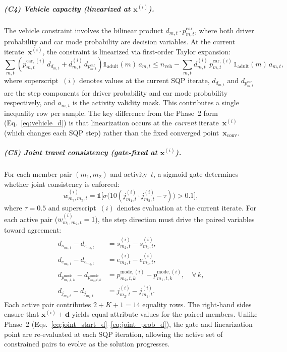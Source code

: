 \documentclass[11pt,a4paper]{article}
\newcommand{\indicator}{\mathbb{1}}
\newcommand{\xconv}{\mathbf{x}_{\mathrm{conv}}}
\begin{document}
\subparagraph{(C4) Vehicle capacity (linearized at $\mathbf{x}^{(i)}$).}
The vehicle constraint involves the bilinear product $d_{m,t} \cdot p^{\mathrm{car}}_{m,t}$, where both driver probability and car mode probability are decision variables.
At the current iterate~$\mathbf{x}^{(i)}$, the constraint is linearized via first-order Taylor expansion:
\begin{equation}
    \sum_{m,t} \left( p^{\mathrm{car},(i)}_{m,t} \, d_{d_{m,t}} + d^{(i)}_{m,t} \, d_{p^{\mathrm{car}}_{m,t}} \right) \indicator_{\mathrm{adult}}(m) \, a_{m,t}
    \leq n_{\mathrm{veh}} - \sum_{m,t} d^{(i)}_{m,t} \, p^{\mathrm{car},(i)}_{m,t} \, \indicator_{\mathrm{adult}}(m) \, a_{m,t},
    \label{eq:vehicle_sqp}
\end{equation}
where superscript~$(i)$ denotes values at the current SQP iterate, $d_{d_{m,t}}$ and $d_{p^{\mathrm{car}}_{m,t}}$ are the step components for driver probability and car mode probability respectively, and $a_{m,t}$ is the activity validity mask.
This contributes a single inequality row per sample.
The key difference from the Phase~2 form (Eq.~\ref{eq:vehicle_d}) is that linearization occurs at the \emph{current} iterate~$\mathbf{x}^{(i)}$ (which changes each SQP step) rather than the fixed converged point~$\xconv$.

\subparagraph{(C5) Joint travel consistency (gate-fixed at $\mathbf{x}^{(i)}$).}
For each member pair $(m_1, m_2)$ and activity~$t$, a sigmoid gate determines whether joint consistency is enforced:
\begin{equation}
    w^{(i)}_{m_1,m_2,t} = \indicator\!\bigl[\sigma\!\bigl(10(j^{(i)}_{m_1,t} \cdot j^{(i)}_{m_2,t} - \tau)\bigr) > 0.1\bigr],
    \label{eq:joint_gate_sqp}
\end{equation}
where $\tau = 0.5$ and superscript~$(i)$ denotes evaluation at the current iterate.
For each active pair ($w^{(i)}_{m_1,m_2,t} = 1$), the step direction must drive the paired variables toward agreement:
\begin{align}
    d_{s_{m_1,t}} - d_{s_{m_2,t}} &= s^{(i)}_{m_2,t} - s^{(i)}_{m_1,t}, \label{eq:joint_start_sqp}\\
    d_{e_{m_1,t}} - d_{e_{m_2,t}} &= e^{(i)}_{m_2,t} - e^{(i)}_{m_1,t}, \label{eq:joint_end_sqp}\\
    d_{p^{\mathrm{mode}}_{m_1,t,k}} - d_{p^{\mathrm{mode}}_{m_2,t,k}} &= p^{\mathrm{mode},(i)}_{m_2,t,k} - p^{\mathrm{mode},(i)}_{m_1,t,k}, \quad \forall\, k, \label{eq:joint_mode_sqp}\\
    d_{j_{m_1,t}} - d_{j_{m_2,t}} &= j^{(i)}_{m_2,t} - j^{(i)}_{m_1,t}. \label{eq:joint_prob_sqp}
\end{align}
Each active pair contributes $2 + K + 1 = 14$ equality rows.
The right-hand sides ensure that $\mathbf{x}^{(i)} + \mathbf{d}$ yields equal attribute values for the paired members.
Unlike Phase~2 (Eqs.~\ref{eq:joint_start_d}--\ref{eq:joint_prob_d}), the gate and linearization point are re-evaluated at each SQP iteration, allowing the active set of constrained pairs to evolve as the solution progresses.
\end{document}
